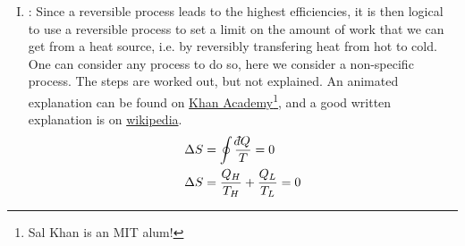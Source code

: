 \documentclass[12pt]{article}
\def\dbar{{\mathchar'26\mkern-12mu d}}
\begin{document}
\begin{enumerate}[(I)]
\begin{align} T \, dS + \dbar W_\text{reversible} &= \dbar Q_\text{irreversible} + \dbar W_\text{irreversible}\\
T \, dS -\dbar Q_\text{irreversible}  &= \dbar W_\text{irreversible} - \dbar W_\text{reversible} > 0
\end{align}
so
\beq \boxed{\dbar W_\text{reversible} < \dbar W_\text{irreversible}}
\ceq
Note that our sign convention in these notes is $dU = \dbar Q + \dbar W$, so negative work is work done by the systems upon the surroundings. The important physical implication is that that if you want to extract work from a system, you get the most work out if the work is performed reversibly. Work that is not obtained from a process due to irreversibilities is sometimes called \emph{lost work}. Similarly, and perhaps more intuitively, if you want to do work upon a system, you will expend the least energy if the work is done reversibly: \\ \emph{The dissipation inherent in irreversible processes reduces efficiency, regardless of whether work is done by a system, or work is performed upon system.} \footnote{This has significant implications for the operation of batteries, fuel cells, and the  materials production, wherein we are generally aiming to make things as reversible as possible.}
\item {}: 
Since a reversible process leads to the highest efficiencies, it is then logical to use a reversible process to set a limit on the amount of work that we can get from a heat source, i.e. by reversibly transfering heat from hot to cold. One can consider any process to do so, here we consider a non-specific process. The steps are worked out, but not explained. An animated explanation can be found on \href{https://www.khanacademy.org/science/physics/thermodynamics/v/efficiency-of-a-carnot-engine}{Khan Academy}\footnote{Sal Khan is an MIT alum!}, and a good written explanation is on \href{https://en.wikipedia.org/wiki/Carnot_cycle}{wikipedia}.
\begin{align*}
\Delta S &= \oint \frac{\dbar Q}{T} = 0\\
\Delta S &= \frac{Q_H}{T_H} + \frac{Q_L}{T_L} = 0\\

\end{align*}
\end{enumerate}
\end{document}
